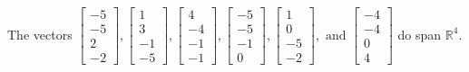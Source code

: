 \begin{exercise}
\begin{exerciseStatement}
  \end{exerciseStatement}
  \begin{exerciseAnswer}
   The vectors \(\left[\begin{array}{r}
-5 \\
-5 \\
2 \\
-2
\end{array}\right] , \left[\begin{array}{r}
1 \\
3 \\
-1 \\
-5
\end{array}\right] , \left[\begin{array}{r}
4 \\
-4 \\
-1 \\
-1
\end{array}\right] , \left[\begin{array}{r}
-5 \\
-5 \\
-1 \\
0
\end{array}\right] , \left[\begin{array}{r}
1 \\
0 \\
-5 \\
-2
\end{array}\right] , \text{ and } \left[\begin{array}{r}
-4 \\
-4 \\
0 \\
4
\end{array}\right]\) 
  	 do  
	span \(\mathbb{R}^4\).
  


  \end{exerciseAnswer}
\end{exercise}